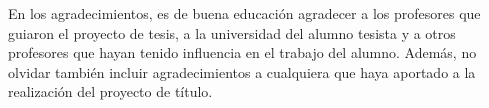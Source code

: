 En los agradecimientos, es de buena educación agradecer a los profesores que guiaron el proyecto de tesis, a la universidad del alumno tesista y a otros profesores que hayan tenido influencia en el trabajo del alumno. Además, no olvidar también incluir agradecimientos a cualquiera que haya aportado a la realización del proyecto de título.
